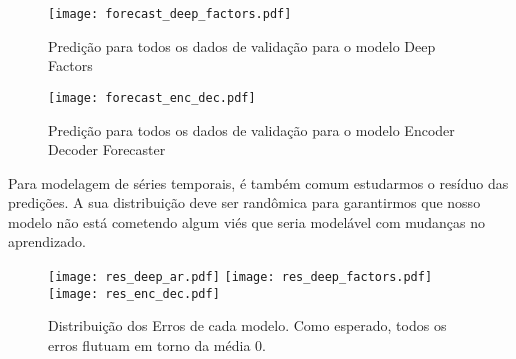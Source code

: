 \begin{figure}[H]
  \label{fig:fordeepfactors}
  \centering
\texttt{[image: forecast\_deep\_factors.pdf]} 
\caption{Predição para todos os dados de validação para o modelo Deep Factors}
\end{figure}

\begin{figure}[H]
  \label{fig:forencdec}
  \centering
\texttt{[image: forecast\_enc\_dec.pdf]} 
\caption{Predição para todos os dados de validação para o modelo Encoder Decoder Forecaster} 
\end{figure}


Para modelagem de séries temporais, é também comum estudarmos o resíduo das predições. A sua distribuição deve ser randômica para garantirmos que nosso modelo não está cometendo algum viés que seria
modelável com mudanças no aprendizado. \\


\begin{figure}[H]
\label{fig:distr}
\centering
\texttt{[image: res\_deep\_ar.pdf]} \hfill
\texttt{[image: res\_deep\_factors.pdf]} \hfill
\texttt{[image: res\_enc\_dec.pdf]} 
\caption{Distribuição dos Erros de cada modelo. Como esperado, todos os erros flutuam em torno da média 0. } 
\end{figure}



